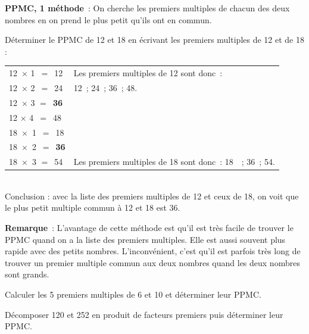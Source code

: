 \begin{methode*1}
 
\textcolor{H1}{\textbf{PPMC, 1 méthode}} : On cherche les premiers multiples de chacun des deux nombres en on prend le plus petit qu'ils ont en commun.

\begin{exemple*1}
Déterminer le PPMC de 12 et 18 en écrivant les premiers multiples de 12 et de 18 : \\[1em]
 \begin{tabularx}{\textwidth}{l|X}
 \textcolor{A1}{12 $\times$ 1 $=$ 12} & Les premiers multiples de 12 sont donc :  \\ 
 \textcolor{A1}{12 $\times$ 2 $=$ 24} &  12 ; 24 ; 36 ; 48.\\
 \textcolor{A1}{12 $\times$ 3 $=$ \textbf{36}} &  \\
 \textcolor{A1}{12 $\times$ 4 $=$ 48} &  \\ 
 \textcolor{A1}{18 $\times$ 1 $=$ 18} &  \\
 \textcolor{A1}{18 $\times$ 2 $=$ \textbf{36}} &  \\
 \textcolor{A1}{18 $\times$ 3 $=$ 54} & Les premiers multiples de 18 sont donc : 18  ; 36 ; 54. \\
\end{tabularx} \\[1em]
Conclusion : avec la liste des premiers multiples de 12 et ceux de 18, on voit que le plus petit multiple commun à 12 et 18 est 36. \\%
 \end{exemple*1}

\vspace{1em}

\textcolor{H1}{\textbf{Remarque}} : L'avantage de cette méthode est qu'il est très facile de trouver le PPMC quand on a la liste des premiers multiples. Elle est aussi souvent plus rapide avec des petits nombres. L'inconvénient, c'est qu'il est parfois très long de trouver un premier multiple commun aux deux nombres quand les deux nombres sont grands.
 
 \exercice
Calculer les 5 premiers multiples de 6 et 10 et déterminer leur PPMC.

\vspace{3em}
 


 \exercice
Décomposer 120 et 252 en produit de facteurs premiers puis déterminer leur PPMC.
 

 \end{methode*1}
 
